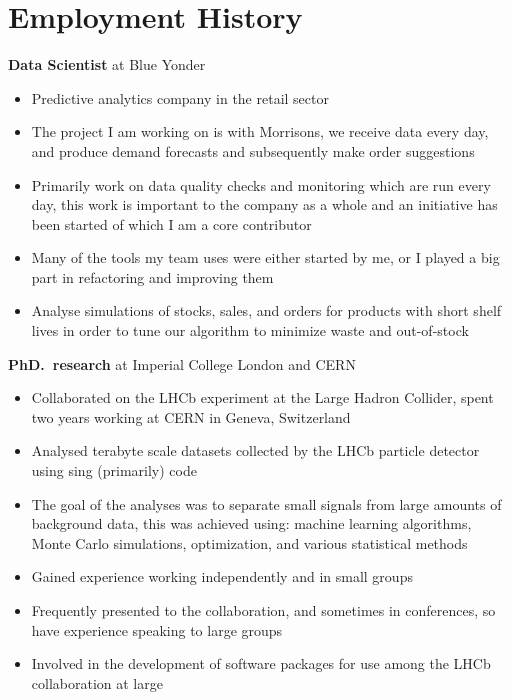 \section{Employment History}

{
  \textbf{Data Scientist} at Blue Yonder
  \begin{itemize}
    \item Predictive analytics company in the retail sector
    \item The project I am working on is with Morrisons,
      we receive data every day, and produce demand forecasts and subsequently make order
      suggestions
    \item Primarily work on data quality checks and monitoring which are run every day, this work
      is important to the company as a whole and an initiative has been started of which I am a
      core contributor
    \item Many of the tools my team uses were either started by me, or I played a big part
      in refactoring and improving them
    \item Analyse simulations of stocks, sales, and orders for products with short shelf lives in
      order to tune our algorithm to minimize waste and out-of-stock
  \end{itemize}
}

\vspace{-1em}

{
  \textbf{PhD.~research} at Imperial College London and CERN
  \begin{itemize}
    \item Collaborated on the LHCb experiment at the Large Hadron Collider, spent two years working
      at CERN in Geneva, Switzerland
    \item Analysed terabyte scale datasets collected by the LHCb particle detector using
      sing (primarily) \cpp code
    \item The goal of the analyses was to separate small signals from large amounts of background
      data, this was achieved using: machine learning algorithms, Monte
      Carlo simulations, optimization, and various statistical methods
    \item Gained experience working independently and in small groups
    \item Frequently presented to the collaboration, and sometimes in conferences, so have
      experience speaking to large groups
    \item Involved in the development of software packages for use among the LHCb collaboration
      at large
  \end{itemize}
}

